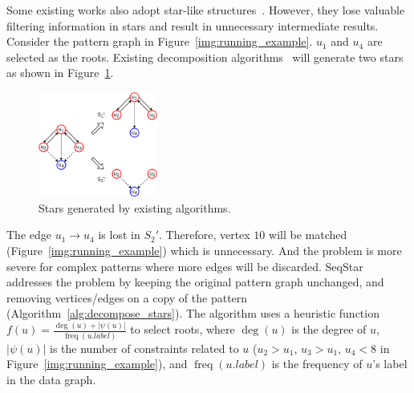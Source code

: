 
Some existing works also adopt star-like structures~\cite{DBLP:journals/pvldb/SunWWSL12,DBLP:journals/pvldb/LaiQLC15}. However, they lose valuable filtering information in stars and result in unnecessary intermediate results.
Consider the pattern graph in Figure~\ref{img:running_example}. $u_1$ and $u_4$ are selected as the roots.
Existing decomposition algorithms~\cite{DBLP:journals/pvldb/SunWWSL12,DBLP:journals/pvldb/LaiQLC15} will generate two stars as shown in Figure~\ref{img:stwig}.
\begin{figure}[ht]
  \centering
  \includegraphics[width=0.35\textwidth]{img/stwig.pdf}
  \caption{Stars generated by existing algorithms.}\label{img:stwig}
\end{figure}
The edge $u_1 \rightarrow u_4$ is lost in $S_2'$.
Therefore, vertex $10$ will be matched (Figure~\ref{img:running_example}) which is unnecessary.
And the problem is more severe for complex patterns where more edges will be discarded.
SeqStar addresses the problem by keeping the original pattern graph unchanged, and removing vertices/edges on a copy of the pattern (Algorithm~\ref{alg:decompose_stars}).
The algorithm uses a heuristic function $f(u) = \frac{\deg(u) + |\psi(u)|}{\operatorname{freq}(u.label)}$ to select roots,
where $\deg(u)$ is the degree of $u$, $|\psi(u)|$ is the number of constraints related to $u$ ($u_2 > u_1$, $u_3 > u_1$, $u_4 < 8$ in Figure~\ref{img:running_example}),
and $\operatorname{freq}(u.label)$ is the frequency of $u$'s label in the data graph.
